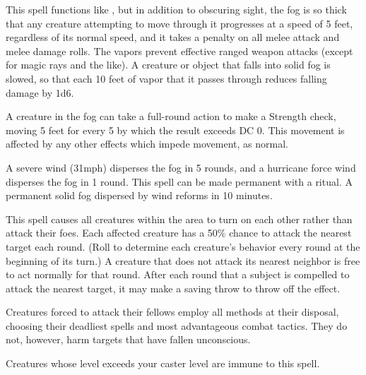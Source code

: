 \spelldur{\durmed}
\begin{spelleffect}
  This spell functions like , but in addition to obscuring sight, the fog is so thick that any creature attempting to move through it progresses at a speed of 5 feet, regardless of its normal speed, and it takes a  penalty on all melee attack and melee damage rolls. The vapors prevent effective ranged weapon attacks (except for magic rays and the like). A creature or object that falls into solid fog is slowed, so that each 10 feet of vapor that it passes through reduces falling damage by 1d6.
  \par A creature in the fog can take a full-round action to make a Strength check, moving 5 feet for every 5 by which the result exceeds DC 0. This movement is affected by any other effects which impede movement, as normal.
\end{spelleffect}
\begin{spellnotes}
  A severe wind (31\add mph) disperses the fog in 5 rounds, and a hurricane force wind disperses the fog in 1 round. This spell can be made permanent with a  ritual. A permanent solid fog dispersed by wind reforms in 10 minutes.
\end{spellnotes}

\spelldur{\durshort}
\begin{spelleffect}
  This spell causes all creatures within the area to turn on each other rather than attack their foes. Each affected creature has a 50\% chance to attack the nearest target each round. (Roll to determine each creature's behavior every round at the beginning of its turn.) A creature that does not attack its nearest neighbor is free to act normally for that round. After each round that a subject is compelled to attack the nearest target, it may make a saving throw to throw off the effect.
  \par Creatures forced to attack their fellows employ all methods at their disposal, choosing their deadliest spells and most advantageous combat tactics. They do not, however, harm targets that have fallen unconscious.
\end{spelleffect}
\begin{spellnotes}
    Creatures whose level exceeds your caster level are immune to this spell.
\end{spellnotes}

